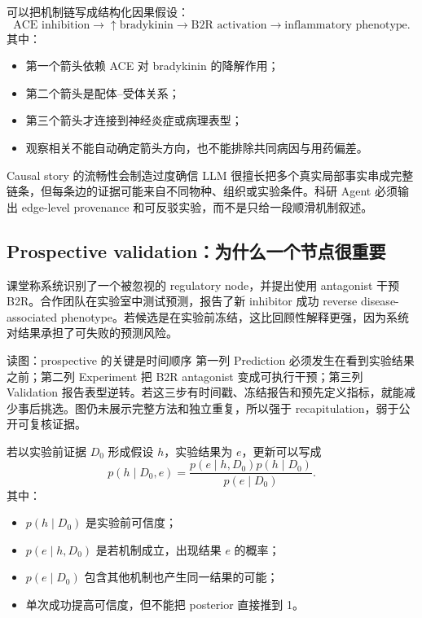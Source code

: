 可以把机制链写成结构化因果假设：
$$
\text{ACE inhibition}
\rightarrow \uparrow\text{bradykinin}
\rightarrow \text{B2R activation}
\rightarrow \text{inflammatory phenotype}.
$$
其中：
\begin{itemize}
  \item 第一个箭头依赖 ACE 对 bradykinin 的降解作用；
  \item 第二个箭头是配体--受体关系；
  \item 第三个箭头才连接到神经炎症或病理表型；
  \item 观察相关不能自动确定箭头方向，也不能排除共同病因与用药偏差。
\end{itemize}

\begin{warningbox}{Causal story 的流畅性会制造过度确信}
LLM 很擅长把多个真实局部事实串成完整链条，但每条边的证据可能来自不同物种、组织或实验条件。科研 Agent 必须输出 edge-level provenance 和可反驳实验，而不是只给一段顺滑机制叙述。
\end{warningbox}

\subsection{Prospective validation：为什么一个节点很重要}

课堂称系统识别了一个被忽视的 regulatory node，并提出使用 antagonist 干预 B2R。合作团队在实验室中测试预测，报告了新 inhibitor 成功 reverse disease-associated phenotype。若候选是在实验前冻结，这比回顾性解释更强，因为系统对结果承担了可失败的预测风险。


\begin{knowledgebox}{读图：prospective 的关键是时间顺序}
第一列 Prediction 必须发生在看到实验结果之前；第二列 Experiment 把 B2R antagonist 变成可执行干预；第三列 Validation 报告表型逆转。若这三步有时间戳、冻结报告和预先定义指标，就能减少事后挑选。图仍未展示完整方法和独立重复，所以强于 recapitulation，弱于公开可复核证据。
\end{knowledgebox}

若以实验前证据 $D_0$ 形成假设 $h$，实验结果为 $e$，更新可以写成
$$
p(h\mid D_0,e)
=\frac{p(e\mid h,D_0)p(h\mid D_0)}
{p(e\mid D_0)}.
$$
其中：
\begin{itemize}
  \item $p(h\mid D_0)$ 是实验前可信度；
  \item $p(e\mid h,D_0)$ 是若机制成立，出现结果 $e$ 的概率；
  \item $p(e\mid D_0)$ 包含其他机制也产生同一结果的可能；
  \item 单次成功提高可信度，但不能把 posterior 直接推到 1。
\end{itemize}

